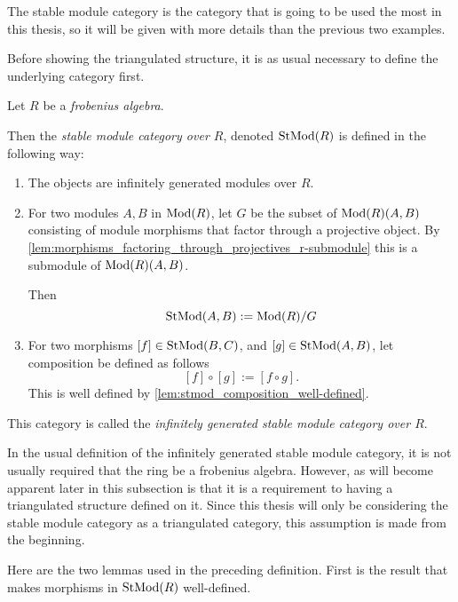 The stable module category is the category that is going to be used the most in this thesis, so it will be given with more details than the previous two examples.

Before showing the triangulated structure, it is as usual necessary to define the underlying category first.

\begin{definition}
    \label{def:stable_module_category}
    Let \( R \) be a \emph{frobenius algebra}.

    Then the \emph{stable module category over \( R \)}, denoted \( \operatorname{StMod}(R) \) is defined in the following way:
    \begin{enumerate}
        \item {
            The objects are infinitely generated modules over \( R \).
        }
        \item {
            For two modules \( A, B \) in \( \operatorname{Mod}(R) \), let \( G \) be the subset of \( \operatorname{Mod}(R)(A, B) \) consisting of module morphisms that factor through a projective object. By \autoref{lem:morphisms_factoring_through_projectives_r-submodule} this is a submodule of \( \operatorname{Mod}(R)(A, B) \).
            
            Then
            \[
                \operatorname{StMod}(A, B) := \operatorname{Mod}(R)/G
            \]
        }
        \item {
            For two morphisms \( [f] \in \operatorname{StMod}(B, C) \), and \( [g] \in \operatorname{StMod}(A, B) \), let composition be defined as follows
            \[
                [f] \circ [g] := [f \circ g].
            \]
            This is well defined by \autoref{lem:stmod_composition_well-defined}.
        }
    \end{enumerate}

    This category is called the \emph{infinitely generated stable module category over \( R \)}.
\end{definition}

In the usual definition of the infinitely generated stable module category, it is not usually required that the ring be a frobenius algebra. However, as will become apparent later in this subsection is that it is a requirement to having a triangulated structure defined on it. Since this thesis will only be considering the stable module category as a triangulated category, this assumption is made from the beginning.

Here are the two lemmas used in the preceding definition. First is the result that makes morphisms in \( \operatorname{StMod}(R) \) well-defined.

